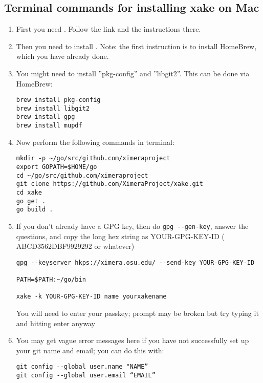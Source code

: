 \documentclass{ximera}
\begin{document}
\subsection{Terminal commands for installing xake on Mac}
\begin{enumerate}

\item First you need . Follow the link and the instructions there.
\item Then you need to install . Note: the first instruction is to install HomeBrew, which you have already done. 
\item You might need to install ''pkg-config” and ''libgit2”. This can be done via HomeBrew:
\begin{verbatim}
brew install pkg-config
brew install libgit2
brew install gpg
brew install mupdf
\end{verbatim}
\item Now perform the following commands in terminal:
\begin{verbatim}
mkdir -p ~/go/src/github.com/ximeraproject
export GOPATH=$HOME/go
cd ~/go/src/github.com/ximeraproject
git clone https://github.com/XimeraProject/xake.git
cd xake
go get .
go build .
\end{verbatim}

\item If you don’t already have a GPG key, then do
\verb!gpg --gen-key!, answer the questions, and copy the long hex string as YOUR-GPG-KEY-ID ( ABCD3562DBF9929292 or whatever)
\begin{verbatim}
gpg --keyserver hkps://ximera.osu.edu/ --send-key YOUR-GPG-KEY-ID

PATH=$PATH:~/go/bin

xake -k YOUR-GPG-KEY-ID name yourxakename
\end{verbatim}
You will need to enter your passkey; prompt may be broken but try typing it and hitting enter anyway

\item You may get vague error messages here if you have not successfully set up your git name and email; you can do this with:
\begin{verbatim}
git config --global user.name "NAME”
git config --global user.email “EMAIL”
\end{verbatim}
\end{enumerate}
\end{document}
